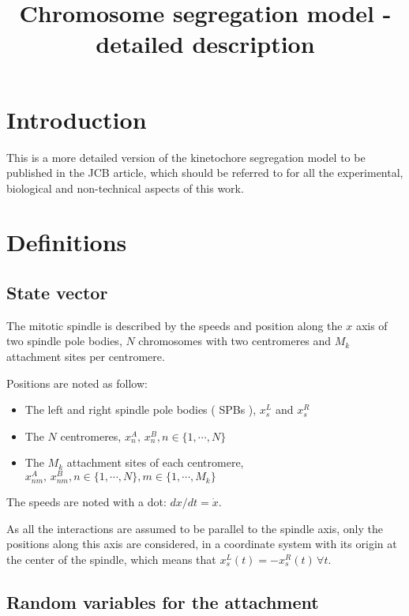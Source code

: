 \documentclass[a4paper,12pt]{article}
\title{Chromosome segregation model - detailed description}
\begin{document}


\maketitle{}


\section*{Introduction}

This is a more detailed version of the kinetochore segregation model
to be published in the JCB article, which should be referred to for
all the experimental, biological and non-technical aspects of this
work.

 
\section{Definitions}
\label{sec:defs}

\subsection{State vector}

The mitotic spindle is described by the speeds and position along the
$x$ axis of two spindle pole bodies, $N$ chromosomes with two
centromeres and $M_k$ attachment sites per centromere.

Positions are noted as follow:
\begin{itemize}
\item The left and right spindle pole bodies ( SPBs ), $x_s^L$ and $x_s^R$
\item The $N$ centromeres, $x_n^A, \, x_n^B, n \in \{1,\cdots, N\}$
\item The $M_k$ attachment sites of each centromere, $x_{nm}^A, \,
  x_{nm}^B, n \in \{1, \cdots, N \}, m \in \{1, \cdots, M_k\}$
\end{itemize}
The speeds are noted with a dot: $dx / dt = \dot{x}$.

As all the interactions are assumed to be parallel to the spindle
axis, only the positions along this axis are considered, in a coordinate
system with its origin at the center of the spindle, which means that
$x_s^L(t) = - x_s^R(t)\, \forall t$.

\subsection{Random variables for the attachment}
\end{document}
